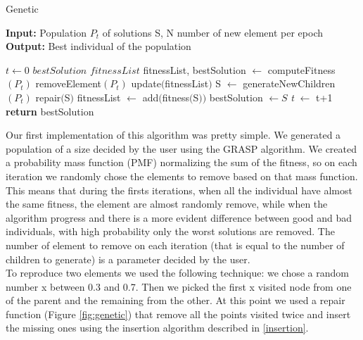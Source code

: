 \begin{algorithm}
	\caption{Genetic}\label{Genetic method}
	\hspace*{\algorithmicindent} \textbf{Input:} Population $P_t$ of solutions S, N number of new element per epoch \\
	\hspace*{\algorithmicindent} \textbf{Output:} Best individual of the population
    \begin{algorithmic}[1]
    		\State $\textit{t} \leftarrow 0$
    		\State $\textit{bestSolution}$
    		\State $\textit{fitnessList}$
    		\State fitnessList, bestSolution $\leftarrow$ computeFitness$(P_t)$ 
    				\State removeElement$(P_t)$
    				\State update$($fitnessList$)$
    			\EndFor
    				\State S $\leftarrow$ generateNewChildren$(P_t)$
    				\State repair$($S$)$
    				\State fitnessList $\leftarrow$ add$($fitness$($S$))$
    					\State bestSolution $\leftarrow S$
    				\EndIf
    			\EndFor
    			\State \textit{t} $\leftarrow$ t+1
    		\EndWhile
    		\State \textbf{return} bestSolution 
    \end{algorithmic}
\end{algorithm}


\noindent Our first implementation of this algorithm was pretty simple. We generated a population of a size decided by the user using the GRASP algorithm. We created a probability mass function (PMF) normalizing the sum of the fitness, so on each iteration we randomly chose the elements to remove based on that mass function. This means that during the firsts iterations, when all the individual have almost the same fitness, the element are almost randomly remove, while when the algorithm progress and there is a more evident difference between good and bad individuals, with high probability only the worst solutions are removed. The number of element to remove on each iteration (that is equal to the number of children to generate) is a parameter decided by the user. \\
To reproduce two elements we used the following technique: we chose a random number x between 0.3 and 0.7. Then we picked the first x visited node from one of the parent and the remaining from the other. At this point we used a repair function (Figure \ref{fig:genetic}) that remove all the points visited twice and insert the missing ones using the insertion algorithm described in \ref{insertion}.


